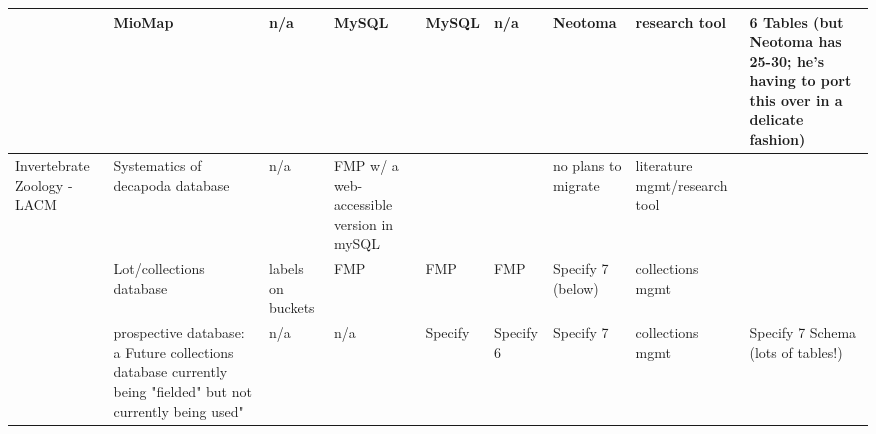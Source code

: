 \begin{table}[h]
{\begin{tabular}{@{}lllllllll@{}}
\multicolumn{1}{|l|}{} & \multicolumn{1}{l|}{MioMap} & \multicolumn{1}{l|}{n/a} & \multicolumn{1}{l|}{MySQL} & \multicolumn{1}{l|}{MySQL} & \multicolumn{1}{l|}{n/a} & \multicolumn{1}{l|}{Neotoma} & \multicolumn{1}{l|}{research tool} & \multicolumn{1}{l|}{6 Tables (but Neotoma has 25-30; he's having to port this over in a delicate fashion)} \\ \midrule
\multicolumn{1}{|l|}{\multirow{3}{*}{Invertebrate Zoology - LACM}} & \multicolumn{1}{l|}{Systematics of decapoda database} & \multicolumn{1}{l|}{n/a} & \multicolumn{1}{l|}{FMP w/ a web-accessible version in mySQL} & \multicolumn{1}{l|}{} & \multicolumn{1}{l|}{} & \multicolumn{1}{l|}{no plans to migrate} & \multicolumn{1}{l|}{literature mgmt/research tool} &  \\ \cmidrule(lr){2-8}
\multicolumn{1}{|l|}{} & \multicolumn{1}{l|}{Lot/collections database} & \multicolumn{1}{l|}{labels on buckets} & \multicolumn{1}{l|}{FMP} & \multicolumn{1}{l|}{FMP} & \multicolumn{1}{l|}{FMP} & \multicolumn{1}{l|}{Specify 7 (below)} & \multicolumn{1}{l|}{collections mgmt} &  \\ \cmidrule(l){2-9} 
\multicolumn{1}{|l|}{} & \multicolumn{1}{l|}{prospective database: a Future collections database currently being "fielded" but not currently being used"} & \multicolumn{1}{l|}{n/a} & \multicolumn{1}{l|}{n/a} & \multicolumn{1}{l|}{Specify} & \multicolumn{1}{l|}{Specify 6} & \multicolumn{1}{l|}{Specify 7} & \multicolumn{1}{l|}{collections mgmt} & \multicolumn{1}{l|}{Specify 7 Schema (lots of tables!)} \\ \bottomrule
\end{tabular}
}
\end{table}
